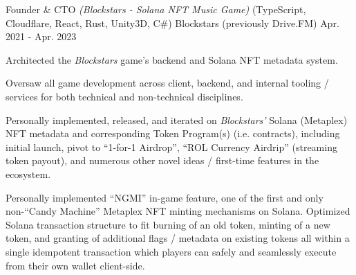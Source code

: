 

\begin{cventries}


  \cventry
    {{\color{awesome}Founder \& CTO} \textit{(Blockstars - Solana NFT Music Game)} (TypeScript, Cloudflare, React, Rust, Unity3D, C\#)} %
    {Blockstars (previously Drive.FM)} %
    {} %
    {Apr. 2021 - Apr. 2023} %
    { %
      \begin{cvitems}
        \item {Architected the \textit{Blockstars} game’s backend and Solana NFT metadata system.}
        \item {Oversaw all game development across client, backend, and internal tooling / services for both technical and non-technical disciplines.}
        \item {Personally implemented, released, and iterated on \textit{Blockstars'} Solana (Metaplex) NFT metadata and corresponding Token Program(s) (i.e. contracts), including initial launch, pivot to “1-for-1 Airdrop”, “ROL Currency Airdrip” (streaming token payout), and numerous other novel ideas / first-time features in the ecosystem.}
        \item {Personally implemented “NGMI” in-game feature, one of the first and only non-“Candy Machine” Metaplex NFT minting mechanisms on Solana. Optimized Solana transaction structure to fit burning of an old token, minting of a new token, and granting of additional flags / metadata on existing tokens all within a single idempotent transaction which players can safely and seamlessly execute from their own wallet client-side.}
      \end{cvitems}
    }



\end{cventries}
